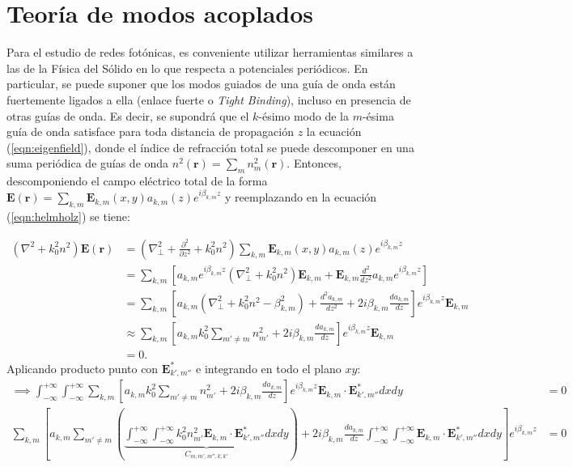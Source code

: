 \section{Teoría de modos acoplados}
	Para el estudio de redes fotónicas, es conveniente utilizar herramientas similares a las de la Física del Sólido en lo que respecta a potenciales periódicos. En particular, se puede suponer que los modos guiados de una guía de onda están fuertemente ligados a ella (enlace fuerte o \textit{Tight Binding}), incluso en presencia de otras guías de onda. Es decir, se supondrá que el $k$-ésimo modo de la $m$-ésima guía de onda satisface para toda distancia de propagación $z$ la ecuación (\ref{eqn:eigenfield}), donde el índice de refracción total se puede descomponer en una suma periódica de guías de onda $n^2(\textbf{r}) = \sum_{m} n^2_m(\textbf{r})$. Entonces, descomponiendo el campo eléctrico total de la forma $\textbf{E}(\textbf{r}) = \sum_{k, m} \textbf{E}_{k, m}(x, y) a_{k, m}(z) e^{i\beta_{k, m} z}$ y reemplazando en la ecuación (\ref{eqn:helmholz}) se tiene:

\begin{align}
	(\nabla^2  + k_0^2n^2) \textbf{E}(\textbf{r}) &= \left(\nabla_\perp^2 + \frac{\partial^2}{\partial z^2} + k_0^2n^2 \right)\sum_{k, m} \textbf{E}_{k, m}(x, y) a_{k, m}(z) e^{i\beta_{k, m} z}
	\nonumber
	\\
	&= \sum_{k, m} \left[a_{k, m} e^{i\beta_{k, m} z} \left(\nabla_\perp^2 +k_0^2n^2 \right)\textbf{E}_{k, m} + \textbf{E}_{k, m}\frac{d^2}{d z^2}a_{k, m} e^{i\beta_{k, m} z}\right]
	\nonumber	
	\\
	&= \sum_{k, m} \left[a_{k, m}  \left(\nabla_\perp^2 +k_0^2n^2 -\beta_{k,m}^2 \right) + \frac{d^2 a_{k, m}}{d z^2}  +2i\beta_{k,m}\frac{d a_{k, m}}{d z} \right]e^{i\beta_{k, m} z}\textbf{E}_{k, m}
		\nonumber	
	\\
	&\approx \sum_{k, m} \left[a_{k, m}  k_0^2\sum_{m'\neq m} n^2_{m'} +2i\beta_{k,m}\frac{d a_{k, m}}{d z} \right]e^{i\beta_{k, m} z}\textbf{E}_{k, m}
	\nonumber	
	\\
	&= 0.
	\nonumber	
\end{align}
Aplicando producto punto con $\textbf{E}_{k', m''}^*$ e integrando en todo el plano $xy$:
\begin{align}
	\implies 
	  \int_{-\infty}^{+\infty}\int_{-\infty}^{+\infty} \sum_{k, m} \left[a_{k, m}  k_0^2\sum_{m'\neq m} n^2_{m'}  +2i\beta_{k,m}\frac{d a_{k, m}}{d z} \right]e^{i\beta_{k, m} z}\textbf{E}_{k, m} \cdot \textbf{E}_{k', m''}^* dxdy &= 0
	  \nonumber
	  \\
	  \sum_{k, m} \left[a_{k, m}  \sum_{m'\neq m}\left( \underbrace{\int_{-\infty}^{+\infty}\int_{-\infty}^{+\infty} k_0^2n^2_{m'} \textbf{E}_{k, m} \cdot \textbf{E}_{k', m''}^* dxdy}_{C_{m, m', m'', k, k'}}\right) +2i\beta_{k,m}\frac{d a_{k, m}}{d z} \int_{-\infty}^{+\infty}\int_{-\infty}^{+\infty} \textbf{E}_{k, m} \cdot \textbf{E}_{k', m''}^* dxdy\right]e^{i\beta_{k, m} z} &= 0
	\label{eqn:CMT1}
\end{align}

	
